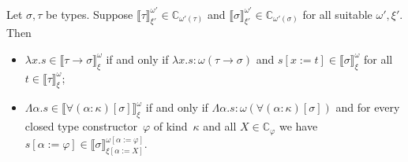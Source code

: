 \documentclass[runningheads,a4paper]{llncs}
\newcommand{\quant}[2]{\forall #1[#2]}
\newcommand{\arrtype}{\rightarrow}
\newcommand{\abs}[2]{\lambda #1.#2}
\newcommand{\tabs}[2]{\Lambda #1.#2}
\newcommand{\subst}[2]{#1:=#2}
\newcommand{\Cb}{\mathbb{C}}
\newcommand{\val}[3]{\ensuremath{\llbracket#1\rrbracket_{#2}^{#3}}}
\begin{document}
\begin{lemma}\label{lem_abstraction_computable}
  Let $\sigma,\tau$ be types. Suppose $\val{\tau}{\xi'}{\omega'} \in
  \Cb_{\omega'(\tau)}$ and $\val{\sigma}{\xi'}{\omega'} \in
  \Cb_{\omega'(\sigma)}$ for all suitable $\omega',\xi'$. Then
  \begin{itemize}
  \item
    $\abs{x}{s} \in \val{\tau \arrtype \sigma}{\xi}{\omega}$ if and
    only if $\abs{x}{s} : \omega(\tau \arrtype \sigma)$ and $s[x:=t]
    \in \val{\sigma}{\xi}{\omega}$ for all $t \in
    \val{\tau}{\xi}{\omega}$;
  \item
    $\tabs{\alpha}{s} \in
    \val{\quant{(\alpha:\kappa)}{\sigma}}{\xi}{\omega}$ if and only if
    $\tabs{\alpha}{s} : \omega(\quant{(\alpha:\kappa)}{\sigma})$ and
    for every closed type constructor~$\varphi$ of kind~$\kappa$ and
    all $X \in \Cb_\varphi$ we have $s[\alpha:=\varphi] \in
    \val{\sigma}{\xi[\subst{\alpha}{X}]}{\omega[\subst{\alpha}{\varphi}]}$.
  \end{itemize}
\end{lemma}
\end{document}
